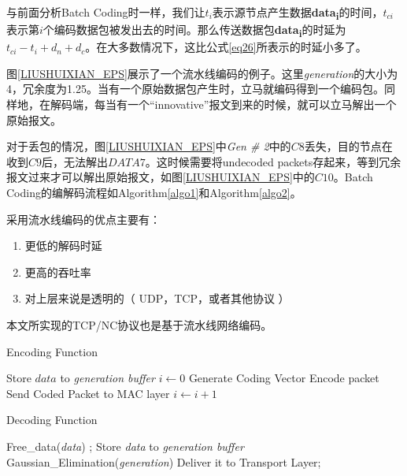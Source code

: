 \par
与前面分析Batch Coding时一样，我们让$t_{i}$表示源节点产生数据\textbf{data}\textbf{\textsubscript{i}}的时间，$t_{ci}$表示第$i$个编码数据包被发出去的时间。那么传送数据包\textbf{data}\textbf{\textsubscript{i}}的时延为$t_{ci} - t_{i}+d_{n}+d_{c}$。在大多数情况下，这比公式\ref{eq26}所表示的时延小多了。
\par
图\ref{LIUSHUIXIAN_EPS}展示了一个流水线编码的例子。这里\emph{generation}的大小为4，冗余度为1.25。当有一个原始数据包产生时，立马就编码得到一个编码包。同样地，在解码端，每当有一个“innovative”报文到来的时候，就可以立马解出一个原始报文。
\par
对于丢包的情况，图\ref{LIUSHUIXIAN_EPS}中\emph{Gen \# 2}中的$C8$丢失，目的节点在收到$C9$后，无法解出$DATA7$。这时候需要将undecoded packets存起来，等到冗余报文过来才可以解出原始报文，如图\ref{LIUSHUIXIAN_EPS}中的$C10$。Batch Coding的编解码流程如Algorithm\ref{algo1}和Algorithm\ref{algo2}。
\par
采用流水线编码的优点主要有：
\begin{enumerate}[fullwidth,itemindent=2em,label=(\arabic*)]
	\item 更低的解码时延
	\item 更高的吞吐率
	\item 对上层来说是透明的（ UDP，TCP，或者其他协议 ）
\end{enumerate}
\par
本文所实现的TCP/NC协议也是基于流水线网络编码。
\begin{algorithm}
	\caption{Encoding Function}  
	\label{algo1}
	Store $data$ to \emph{generation buffer}\;
	$i \leftarrow 0$\;
	{  
		{  
			\Break\;
		} 
		Generate Coding Vector\;
		{
		}
		Encode packet\;
		Send Coded Packet to MAC layer\;
		$i \leftarrow i+1$\;
	}
\end{algorithm}
	\begin{algorithm}
		\caption{Decoding Function}
		\label{algo2}  
		{
			Free\_data(\emph{data})\;
			\Return;
		}
		Store \emph{data} to \emph{generation buffer}\;
		Gaussian\_Elimination(\emph{generation})\;
		{
			Deliver it to Transport Layer;
		}
	\end{algorithm}


